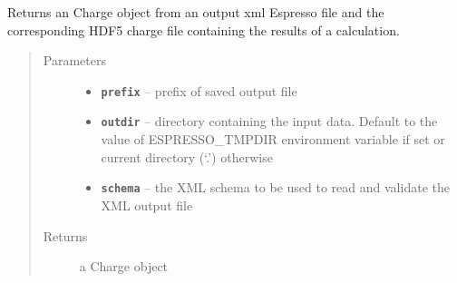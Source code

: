 \documentclass[letterpaper,10pt,english]{sphinxmanual}
\begin{document}
\begin{fulllineitems}
\label{postqe:postqe.api.get_charge}
Returns an Charge object from an output xml Espresso file and the
corresponding HDF5 charge file containing the results of a calculation.
\begin{quote}\begin{description}
\item[{Parameters}] \leavevmode\begin{itemize}
\item {} 
\textbf{\texttt{prefix}} -- prefix of saved output file

\item {} 
\textbf{\texttt{outdir}} -- directory containing the input data. Default to the value of
ESPRESSO\_TMPDIR environment variable if set or current directory (`.') otherwise

\item {} 
\textbf{\texttt{schema}} -- the XML schema to be used to read and validate the XML output file

\end{itemize}

\item[{Returns}] \leavevmode
a Charge object

\end{description}\end{quote}

\end{fulllineitems}

\end{document}

